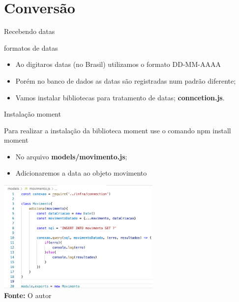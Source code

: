\documentclass{beamer}
\begin{document}
\section{Conversão}
    \begin{frame}[label=lists]{Recebendo datas}
    \begin{exampleblock}{formatos de datas}
        	\begin{itemize}
	\item Ao digitaros datas (no Brasil) utilizamos o formato DD-MM-AAAA
	\item Porém no banco de dados as datas são registradas num padrão diferente;
	\item Vamos instalar bibliotecas para tratamento de datas; \textbf{conncetion.js}.
        	\end{itemize}
      \end{exampleblock}
    \end{frame}
    \begin{frame}[label=lists]{Instalação moment}

         Para realizar a instalação da biblioteca moment use o comando \alert{npm install moment}
         \begin{itemize}
         \item No arquivo \textbf{models/movimento.js};
         \item Adicionaremos a data ao objeto movimento
         \end{itemize}
	            \includegraphics[width=80mm]{resources/aula9_1.png}\\
            \tiny{\textbf{Fonte:} O autor}
    \end{frame}
\end{document}
